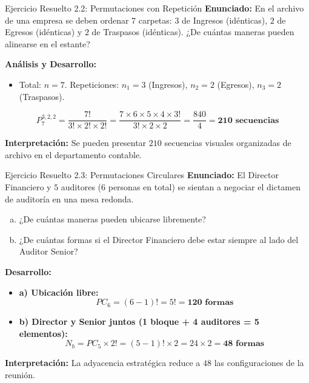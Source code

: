 \documentclass[10pt]{beamer}
\begin{document}
\begin{frame}{Ejercicio Resuelto 2.2: Permutaciones con Repetición}
  \textbf{Enunciado:} En el archivo de una empresa se deben ordenar $7$ carpetas: $3$ de Ingresos (idénticas), $2$ de Egresos (idénticas) y $2$ de Traspasos (idénticas). ¿De cuántas maneras pueden alinearse en el estante?

  \vspace{0.15cm}
  \textbf{Análisis y Desarrollo:}
  \begin{itemize}
    \item Total: $n = 7$. Repeticiones: $n_1 = 3$ (Ingresos), $n_2 = 2$ (Egresos), $n_3 = 2$ (Traspasos).
  \end{itemize}

  $$P_7^{3, 2, 2} = \frac{7!}{3! \times 2! \times 2!} = \frac{7 \times 6 \times 5 \times 4 \times 3!}{3! \times 2 \times 2} = \frac{840}{4} = \mathbf{210 \text{ secuencias}}$$

  \textbf{Interpretación:} Se pueden presentar $210$ secuencias visuales organizadas de archivo en el departamento contable.
\end{frame}

\begin{frame}{Ejercicio Resuelto 2.3: Permutaciones Circulares}
  \textbf{Enunciado:} El Director Financiero y $5$ auditores ($6$ personas en total) se sientan a negociar el dictamen de auditoría en una mesa redonda.
  \begin{enumerate}[a)]
    \item ¿De cuántas maneras pueden ubicarse libremente?
    \item ¿De cuántas formas si el Director Financiero debe estar siempre al lado del Auditor Senior?
  \end{enumerate}

  \vspace{0.1cm}
  \textbf{Desarrollo:}
  \begin{itemize}
    \item \textbf{a) Ubicación libre:}
    $$PC_6 = (6-1)! = 5! = \mathbf{120 \text{ formas}}$$
    \item \textbf{b) Director y Senior juntos (1 bloque + 4 auditores = 5 elementos):}
    $$N_b = PC_5 \times 2! = (5-1)! \times 2 = 24 \times 2 = \mathbf{48 \text{ formas}}$$
  \end{itemize}

  \textbf{Interpretación:} La adyacencia estratégica reduce a $48$ las configuraciones de la reunión.
\end{frame}
\end{document}
